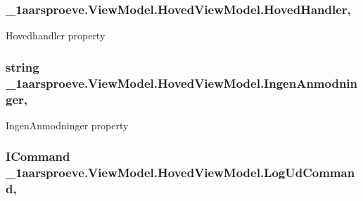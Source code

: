 \subsubsection[{Hoved\+Handler}]{ \+\_\+1aarsproeve.\+View\+Model.\+Hoved\+View\+Model.\+Hoved\+Handler\hspace{0.3cm}{\ttfamily [get]}, {\ttfamily [set]}}\label{class__1aarsproeve_1_1_view_model_1_1_hoved_view_model_aaeba819c1330608f58f968d670367c47}


Hovedhandler property 

\hypertarget{class__1aarsproeve_1_1_view_model_1_1_hoved_view_model_a358015de6da111dbb14cc14d7a0a421a}{}
\subsubsection[{Ingen\+Anmodninger}]{\setlength{\rightskip}{0pt plus 5cm}string \+\_\+1aarsproeve.\+View\+Model.\+Hoved\+View\+Model.\+Ingen\+Anmodninger\hspace{0.3cm}{\ttfamily [get]}, {\ttfamily [set]}}\label{class__1aarsproeve_1_1_view_model_1_1_hoved_view_model_a358015de6da111dbb14cc14d7a0a421a}


Ingen\+Anmodninger property 

\hypertarget{class__1aarsproeve_1_1_view_model_1_1_hoved_view_model_ae541527e8e9063cc3337b229b93c7e48}{}
\subsubsection[{Log\+Ud\+Command}]{\setlength{\rightskip}{0pt plus 5cm}I\+Command \+\_\+1aarsproeve.\+View\+Model.\+Hoved\+View\+Model.\+Log\+Ud\+Command\hspace{0.3cm}{\ttfamily [get]}, {\ttfamily [set]}}\label{class__1aarsproeve_1_1_view_model_1_1_hoved_view_model_ae541527e8e9063cc3337b229b93c7e48}


